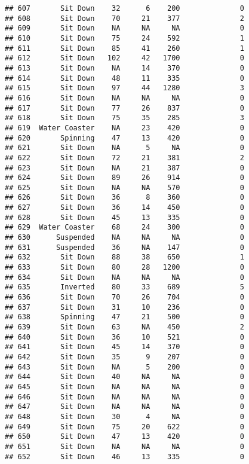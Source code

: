 \documentclass[
]{article}
\begin{document}
\begin{verbatim}
## 607       Sit Down    32      6    200              0
## 608       Sit Down    70     21    377              2
## 609       Sit Down    NA     NA     NA              0
## 610       Sit Down    75     24    592              1
## 611       Sit Down    85     41    260              1
## 612       Sit Down   102     42   1700              0
## 613       Sit Down    NA     14    370              0
## 614       Sit Down    48     11    335              0
## 615       Sit Down    97     44   1280              3
## 616       Sit Down    NA     NA     NA              0
## 617       Sit Down    77     26    837              0
## 618       Sit Down    75     35    285              3
## 619  Water Coaster    NA     23    420              0
## 620       Spinning    47     13    420              0
## 621       Sit Down    NA      5     NA              0
## 622       Sit Down    72     21    381              2
## 623       Sit Down    NA     21    387              0
## 624       Sit Down    89     26    914              0
## 625       Sit Down    NA     NA    570              0
## 626       Sit Down    36      8    360              0
## 627       Sit Down    36     14    450              0
## 628       Sit Down    45     13    335              0
## 629  Water Coaster    68     24    300              0
## 630      Suspended    NA     NA     NA              0
## 631      Suspended    36     NA    147              0
## 632       Sit Down    88     38    650              1
## 633       Sit Down    80     28   1200              0
## 634       Sit Down    NA     NA     NA              0
## 635       Inverted    80     33    689              5
## 636       Sit Down    70     26    704              0
## 637       Sit Down    31     10    236              0
## 638       Spinning    47     21    500              0
## 639       Sit Down    63     NA    450              2
## 640       Sit Down    36     10    521              0
## 641       Sit Down    45     14    370              0
## 642       Sit Down    35      9    207              0
## 643       Sit Down    NA      5    200              0
## 644       Sit Down    40     NA     NA              0
## 645       Sit Down    NA     NA     NA              0
## 646       Sit Down    NA     NA     NA              0
## 647       Sit Down    NA     NA     NA              0
## 648       Sit Down    30      4     NA              0
## 649       Sit Down    75     20    622              0
## 650       Sit Down    47     13    420              0
## 651       Sit Down    NA     NA     NA              0
## 652       Sit Down    46     13    335              0

\end{verbatim}
\end{document}
